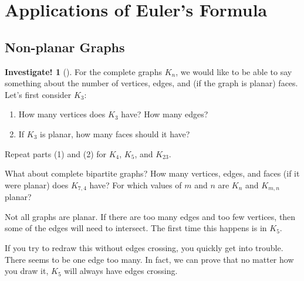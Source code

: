\documentclass[10pt,]{book}
\theoremstyle{plain}
\theoremstyle{definition}
\theoremstyle{definition}
\theoremstyle{definition}
\newtheorem{investigation}[project]{Investigate!}
\theoremstyle{definition}
\numberwithin{equation}{chapter}
\newcommand{\vtx}[2]{node[fill,circle,inner sep=0pt, minimum size=4pt,label=#1:#2]{}}
\renewcommand{\v}{\vtx{above}{}}
\begin{document}
\section[{Applications of Euler's Formula}]{Applications of Euler's Formula}\label{sec_planar}
\typeout{************************************************}
\typeout{************************************************}
\subsection[{Non-planar Graphs}]{Non-planar Graphs}\label{subsection-7}
\begin{investigation}[]\label{investigation-3}
\hypertarget{p-242}{}%
For the complete graphs \(K_n\), we would like to be able to say something about the number of vertices, edges, and (if the graph is planar) faces. Let's first consider \(K_3\): %
\begin{enumerate}
\item\hypertarget{li-76}{}\hypertarget{p-243}{}%
How many vertices does \(K_3\) have? How many edges?%
\item\hypertarget{li-77}{}\hypertarget{p-244}{}%
If \(K_3\) is planar, how many faces should it have?%
\end{enumerate}
%
\par
\hypertarget{p-245}{}%
Repeat parts (1) and (2) for \(K_4\), \(K_5\), and \(K_{23}\).%
\par
\hypertarget{p-246}{}%
What about complete bipartite graphs? How many vertices, edges, and faces (if it were planar) does \(K_{7,4}\) have?  For which values of \(m\) and \(n\) are \(K_n\) and \(K_{m,n}\) planar?%
\end{investigation}
\hypertarget{p-247}{}%
Not all graphs are planar. If there are too many edges and too few vertices, then some of the edges will need to intersect. The first time this happens is in \(K_5\).%
\begin{sidebyside}{1}{0.4}{0.4}{0}
\begin{sbspanel}{0.2}
\resizebox{\linewidth}{!}{{
\begin{tikzpicture}
      \foreach \x in {0,...,4}
      \draw (\x*72+18:1) \v -- (\x*72+90:1) -- (\x*72-54:1);
    \end{tikzpicture}
}
}
\end{sbspanel}
\end{sidebyside}
\par
\hypertarget{p-248}{}%
If you try to redraw this without edges crossing, you quickly get into trouble. There seems to be one edge too many. In fact, we can prove that no matter how you draw it, \(K_5\) will always have edges crossing.%
\end{document}
